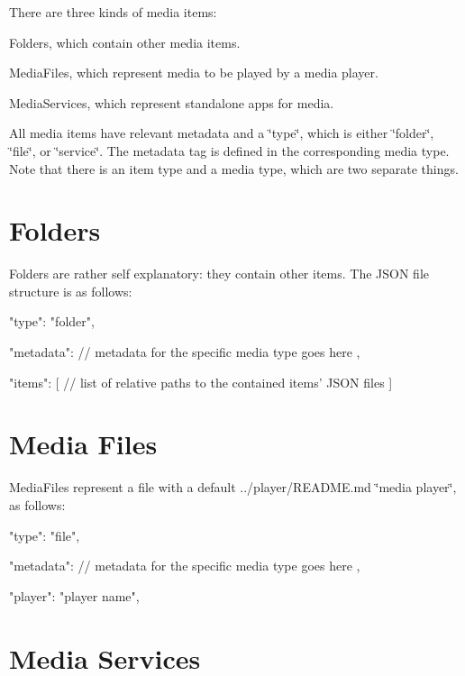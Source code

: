 There are three kinds of media items\-:


\begin{DoxyItemize}
\item {\ttfamily Folder}s, which contain other media items.
\item {\ttfamily Media\-File}s, which represent media to be played by a media player.
\item {\ttfamily Media\-Service}s, which represent standalone apps for media.
\end{DoxyItemize}

All media items have relevant metadata and a {\ttfamily \char`\"{}type\char`\"{}}, which is either {\ttfamily \char`\"{}folder\char`\"{}}, {\ttfamily \char`\"{}file\char`\"{}}, or {\ttfamily \char`\"{}service\char`\"{}}. The {\ttfamily metadata} tag is defined in the corresponding media type. Note that there is an item type and a media type, which are two separate things.

\section*{Folders}

{\ttfamily Folder}s are rather self explanatory\-: they contain other items. The J\-S\-O\-N file structure is as follows\-: \begin{DoxyVerb}{
    "type": "folder",

    "metadata": {
        // metadata for the specific media type goes here
    },

    "items": [
        // list of relative paths to the contained items' JSON files
    ]
}
\end{DoxyVerb}


\section*{Media Files}

{\ttfamily Media\-File}s represent a file with a default ../player/\-R\-E\-A\-D\-M\-E.md \char`\"{}media player\char`\"{}, as follows\-: \begin{DoxyVerb}{
    "type": "file",

    "metadata": {
        // metadata for the specific media type goes here
    },

    "player": "player name",
}
\end{DoxyVerb}


\section*{Media Services}

